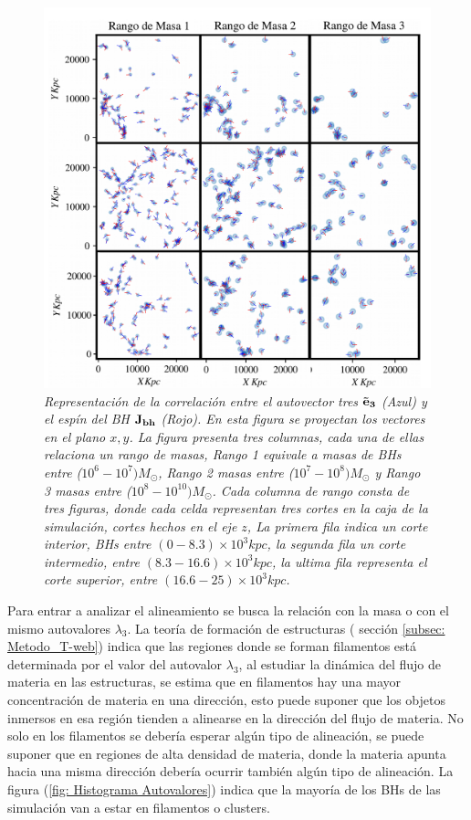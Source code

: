 \begin{figure}
    \includegraphics[width=1\textwidth]{./figures/6_Resultados/cosmo01/ll.jpeg}
   \caption{\emph{Representación de la correlación entre el autovector tres ${\bf{\vec{e}}_{3}}$ (Azul) y el espín del BH ${\bf{J_{bh}}}$ (Rojo). En esta figura se proyectan los vectores en el plano $x,y$. La figura presenta tres columnas, cada una de ellas relaciona un rango de masas, Rango 1 equivale a masas de BHs entre ($10^6-10^7)M_{\odot}$, Rango 2 masas entre ($10^7-10^8)M_{\odot}$ y Rango 3 masas entre ($10^8-10^10)M_{\odot}$. Cada columna de rango consta de tres figuras, donde cada celda  representan tres cortes en la caja de la simulación, cortes hechos en el eje $z$, La primera fila indica un corte interior, BHs entre $(0-8.3)\times10^{3} kpc$,  la segunda fila un corte intermedio, entre $(8.3-16.6)\times10^{3} kpc$, la ultima fila representa el corte superior, entre  $ (16.6-25)\times10^{3} kpc$. }}
    \label{fig: proyeccion espines}
\end{figure}


Para entrar a analizar el alineamiento se busca la relación con la masa o con el mismo autovalores $\lambda_{3}$. 
La teoría de formación de estructuras ( sección \ref{subsec: Metodo_T-web}) indica que las regiones donde se forman filamentos está determinada por el valor del autovalor  $\lambda_{3}$, al estudiar la dinámica del flujo de materia en las estructuras, se estima  que en filamentos hay una mayor concentración de materia en una dirección, esto puede suponer que los objetos inmersos en esa región tienden a alinearse en la dirección del flujo de materia. No solo en los filamentos se debería esperar algún tipo de alineación, se puede suponer que en regiones de alta densidad de materia, donde la materia apunta hacia una misma dirección debería ocurrir también algún tipo de alineación. La figura (\ref{fig: Histograma Autovalores}) indica que la mayoría de los BHs de las simulación van a estar en filamentos o clusters. 

